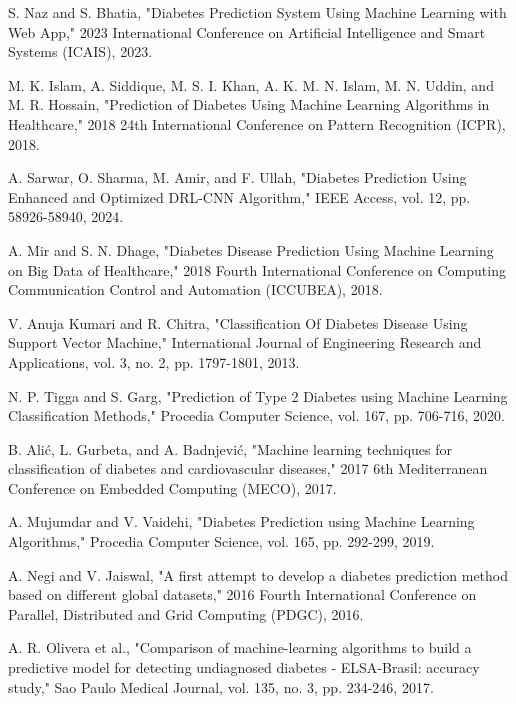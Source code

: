 \documentclass[conference]{IEEEtran}
\begin{document}
\begin{thebibliography}{00}
 S. Naz and S. Bhatia, "Diabetes Prediction System Using Machine Learning with Web App," 2023 International Conference on Artificial Intelligence and Smart Systems (ICAIS), 2023.

 M. K. Islam, A. Siddique, M. S. I. Khan, A. K. M. N. Islam, M. N. Uddin, and M. R. Hossain, "Prediction of Diabetes Using Machine Learning Algorithms in Healthcare," 2018 24th International Conference on Pattern Recognition (ICPR), 2018.

 A. Sarwar, O. Sharma, M. Amir, and F. Ullah, "Diabetes Prediction Using Enhanced and Optimized DRL-CNN Algorithm," IEEE Access, vol. 12, pp. 58926-58940, 2024.

 A. Mir and S. N. Dhage, "Diabetes Disease Prediction Using Machine Learning on Big Data of Healthcare," 2018 Fourth International Conference on Computing Communication Control and Automation (ICCUBEA), 2018.

 V. Anuja Kumari and R. Chitra, "Classification Of Diabetes Disease Using Support Vector Machine," International Journal of Engineering Research and Applications, vol. 3, no. 2, pp. 1797-1801, 2013.

 N. P. Tigga and S. Garg, "Prediction of Type 2 Diabetes using Machine Learning Classification Methods," Procedia Computer Science, vol. 167, pp. 706-716, 2020.

 B. Alić, L. Gurbeta, and A. Badnjević, "Machine learning techniques for classification of diabetes and cardiovascular diseases," 2017 6th Mediterranean Conference on Embedded Computing (MECO), 2017.

 A. Mujumdar and V. Vaidehi, "Diabetes Prediction using Machine Learning Algorithms," Procedia Computer Science, vol. 165, pp. 292-299, 2019.

 A. Negi and V. Jaiswal, "A first attempt to develop a diabetes prediction method based on different global datasets," 2016 Fourth International Conference on Parallel, Distributed and Grid Computing (PDGC), 2016.

 A. R. Olivera et al., "Comparison of machine-learning algorithms to build a predictive model for detecting undiagnosed diabetes - ELSA-Brasil: accuracy study," Sao Paulo Medical Journal, vol. 135, no. 3, pp. 234-246, 2017.

\end{thebibliography}
\end{document}
